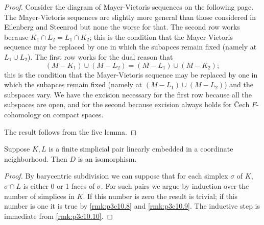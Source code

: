 \documentclass[../main]{subfiles}
\begin{document}
\begin{proof}
Consider the diagram of Mayer-Vietoris sequences on the following page. The Mayer-Vietoris sequences are slightly more general than those considered in Eilenberg and Steenrod but none the worse for that. The second row works because $K_1 \cap L_2 = L_1 \cap K_2$; this is the condition that the Mayer-Vietoris sequence may be replaced by one in which the subapces remain fixed (namely at $L_1 \cup L_2$). The first row works for the dual reason that
\[(M-K_1) \cup (M-L_2) = (M-L_1) \cup (M-K_2);\]
this is the condition that the Mayer-Vietoris sequence may be replaced by one in which the subapces remain fixed (namely at $(M-L_1) \cup (M-L_2)$) and the subspaces vary. We have the excision necessary for the first row because all the subspaces are open, and for the second because excision always holds for \v{C}ech $F$-cohomology on compact spaces.

The result follows from the five lemma.
\end{proof}
\begin{remark}\label{rmk:p3c10.11}
Suppose $K,L$ is a finite simplicial pair linearly embedded in a coordinate neighborhood. Then $D$ is an isomorphism.
\end{remark}
\begin{proof}
By barycentric subdivision we can suppose that for each simplex $\sigma$ of $K$, $\sigma \cap L$ is either 0 or 1 faces of $\sigma$. For such pairs we argue by induction over the number of simplices in $K$. If this number is zero the result is trivial; if this number is one it is true by \ref{rmk:p3c10.8} and \ref{rmk:p3c10.9}. The inductive step is immediate from \ref{rmk:p3c10.10}.
\end{proof}
\end{document}
